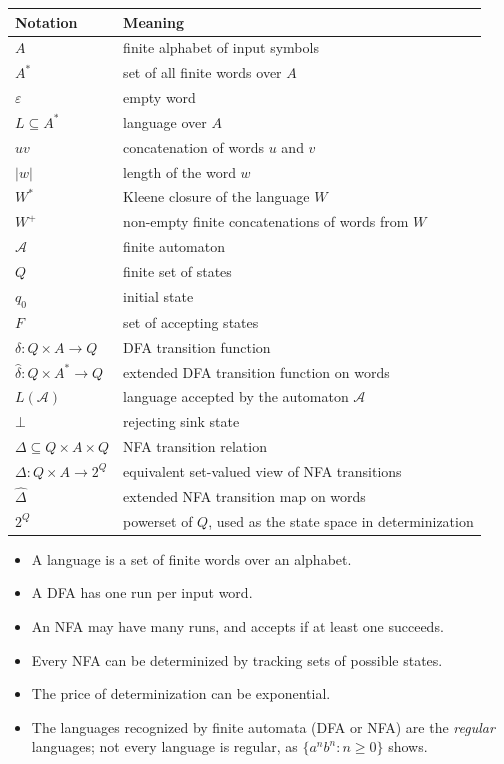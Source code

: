 \begin{center}
\begin{tabular}{@{}ll@{}}
\toprule
\textbf{Notation} & \textbf{Meaning} \\
\midrule
$A$ & finite alphabet of input symbols \\
$A^*$ & set of all finite words over $A$ \\
$\varepsilon$ & empty word \\
$L \subseteq A^*$ & language over $A$ \\
$uv$ & concatenation of words $u$ and $v$ \\
$|w|$ & length of the word $w$ \\
$W^*$ & Kleene closure of the language $W$ \\
$W^+$ & non-empty finite concatenations of words from $W$ \\
$\mathcal{A}$ & finite automaton \\
$Q$ & finite set of states \\
$q_0$ & initial state \\
$F$ & set of accepting states \\
$\delta:Q\times A\to Q$ & DFA transition function \\
$\widehat{\delta}:Q\times A^*\to Q$ & extended DFA transition function on words \\
$L(\mathcal{A})$ & language accepted by the automaton $\mathcal{A}$ \\
$\bot$ & rejecting sink state \\
$\Delta \subseteq Q\times A\times Q$ & NFA transition relation \\
$\Delta:Q\times A\to 2^Q$ & equivalent set-valued view of NFA transitions \\
$\widehat{\Delta}$ & extended NFA transition map on words \\
$2^Q$ & powerset of $Q$, used as the state space in determinization \\
\bottomrule
\end{tabular}
\end{center}

\begin{summarybox}
\begin{itemize}[nosep]
  \item A language is a set of finite words over an alphabet.
  \item A DFA has one run per input word.
  \item An NFA may have many runs, and accepts if at least one succeeds.
  \item Every NFA can be determinized by tracking sets of possible states.
  \item The price of determinization can be exponential.
  \item The languages recognized by finite automata (DFA or NFA) are the
    \emph{regular} languages; not every language is regular, as
    $\{a^n b^n:n\geq 0\}$ shows.
\end{itemize}
\end{summarybox}

